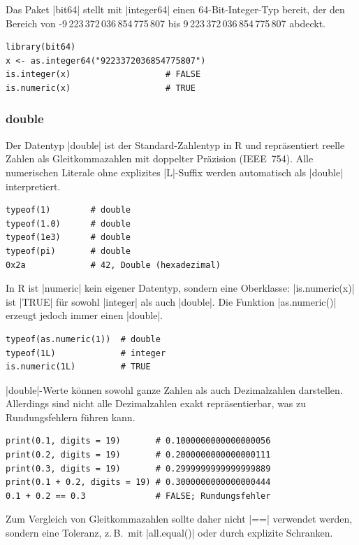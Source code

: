 \documentclass[10pt,twocolumn]{scrartcl}
\renewcommand{\lstinline}{\mycoloredinline}
\begin{document}
Das Paket \lstinline|bit64| stellt mit \lstinline|integer64| einen 64-Bit-Integer-Typ bereit, der den Bereich von -9\,223\,372\,036\,854\,775\,807 bis 9\,223\,372\,036\,854\,775\,807 abdeckt.

\begin{lstlisting}
library(bit64)
x <- as.integer64("9223372036854775807")
is.integer(x)                   # FALSE
is.numeric(x)                   # TRUE
\end{lstlisting}


\subsubsection{double}

Der Datentyp \lstinline|double| ist der Standard-Zahlentyp in R und repräsentiert reelle Zahlen als Gleitkommazahlen mit doppelter Präzision (IEEE~754). Alle numerischen Literale ohne explizites \lstinline|L|-Suffix werden automatisch als \lstinline|double| interpretiert.

\begin{lstlisting}
typeof(1)        # double
typeof(1.0)      # double
typeof(1e3)      # double
typeof(pi)       # double
0x2a             # 42, Double (hexadezimal)
\end{lstlisting}

In R ist \lstinline|numeric| kein eigener Datentyp, sondern eine Oberklasse: \lstinline|is.numeric(x)| ist \lstinline|TRUE| für sowohl \lstinline|integer| als auch \lstinline|double|. Die Funktion \lstinline|as.numeric()| erzeugt jedoch immer einen \lstinline|double|.

\begin{lstlisting}
typeof(as.numeric(1))  # double
typeof(1L)             # integer
is.numeric(1L)         # TRUE
\end{lstlisting}

\lstinline|double|-Werte können sowohl ganze Zahlen als auch Dezimalzahlen darstellen. Allerdings sind nicht alle Dezimalzahlen exakt repräsentierbar, was zu Rundungsfehlern führen kann.

\begin{lstlisting}
print(0.1, digits = 19)       # 0.1000000000000000056
print(0.2, digits = 19)       # 0.2000000000000000111
print(0.3, digits = 19)       # 0.2999999999999999889
print(0.1 + 0.2, digits = 19) # 0.3000000000000000444
0.1 + 0.2 == 0.3              # FALSE; Rundungsfehler
\end{lstlisting}

Zum Vergleich von Gleitkommazahlen sollte daher nicht \lstinline|==| verwendet werden, sondern eine Toleranz, z.\,B.\ mit \lstinline|all.equal()| oder durch explizite Schranken.
\end{document}
